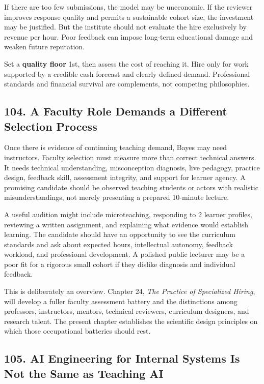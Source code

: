 If there are too few submissions, the model may be uneconomic. If the reviewer improves response quality and permits a sustainable cohort size, the investment may be justified. But the institute should not evaluate the hire exclusively by revenue per hour. Poor feedback can impose long-term educational damage and weaken future reputation.

Set a \textbf{quality floor} 1st, then assess the cost of reaching it. Hire only for work supported by a credible cash forecast and clearly defined demand. Professional standards and financial survival are complements, not competing philosophies.

\subsection*{104. A Faculty Role Demands a Different Selection Process}

Once there is evidence of continuing teaching demand, Bayes may need instructors. Faculty selection must measure more than correct technical answers. It needs technical understanding, misconception diagnosis, live pedagogy, practice design, feedback skill, assessment integrity, and support for learner agency. A promising candidate should be observed teaching students or actors with realistic misunderstandings, not merely presenting a prepared 10-minute lecture.

A useful audition might include microteaching, responding to 2 learner profiles, reviewing a written assignment, and explaining what evidence would establish learning. The candidate should have an opportunity to see the curriculum standards and ask about expected hours, intellectual autonomy, feedback workload, and professional development. A polished public lecturer may be a poor fit for a rigorous small cohort if they dislike diagnosis and individual feedback.

This is deliberately an overview. Chapter 24, \textit{The Practice of Specialized Hiring}, will develop a fuller faculty assessment battery and the distinctions among professors, instructors, mentors, technical reviewers, curriculum designers, and research talent. The present chapter establishes the scientific design principles on which those occupational batteries should rest.

\subsection*{105. AI Engineering for Internal Systems Is Not the Same as Teaching AI}

